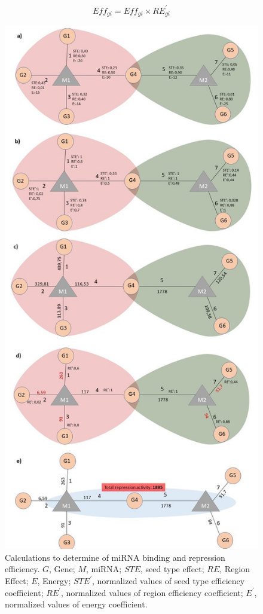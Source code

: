 \documentclass[]{article}
\begin{document}
\begin{equation}
Eff_{gi}= Eff_{gi}\times RE^\prime_{gi} \tag{4}\label{eq:4}
\end{equation}

\begin{figure}
\hypertarget{fig2}{%
\centering
\includegraphics{fig2.jpg}
\caption{Calculations to determine of miRNA binding and repression
efficiency. \(G\), Gene; \(M\), miRNA; \(STE\), seed type effect;
\(RE\), Region Effect; \(E\), Energy; \(STE^\prime\), normalized values
of seed type efficiency coefficient; \(RE^\prime\), normalized values of
region efficiency coefficient; \(E^\prime\), normalized values of energy
coefficient.}\label{fig2}
}
\end{figure}
\end{document}
